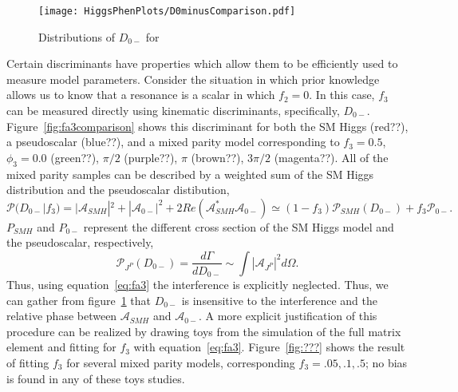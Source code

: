 \begin{figure}
\begin{center}
\texttt{[image: HiggsPhenPlots/D0minusComparison.pdf]}
\label{fig:fa3Comparison}
\caption{Distributions of $D_{0-}$ for }
\end{center}
\end{figure}

Certain discriminants have properties which allow them to be efficiently
used to measure model parameters.  Consider the situation in which prior
knowledge allows us to know that a resonance is a scalar in which $f_2=0$.
In this case, $f_3$ can be measured directly using kinematic discriminants,
specifically, $D_{0-}$.  Figure~\ref{fig:fa3comparison} shows this discriminant for
both the SM Higgs (red??), a pseudoscalar (blue??), and a mixed parity 
model corresponding to $f_3=0.5$, $\phi_3=0.0$ (green??), $\pi/2$ (purple??),
$\pi$ (brown??), $3\pi/2$ (magenta??).  All of the mixed parity samples
can be described by a weighted sum of the SM Higgs distribution and the 
pseudoscalar distibution, 
\begin{equation}
\mathscr{P}(D_{0-}|f_3) = |\mathscr{A}_{SMH}|^2 + |\mathscr{A}_{0-}|^2 + 2Re(\mathscr{A}_{SMH}^*\mathscr{A}_{0-}) \simeq (1-f_3)\mathscr{P}_{SMH}(D_{0-})+f_3\mathscr{P}_{0-}.
\label{eq:fa3}
\end{equation}
$P_{SMH}$ and $P_{0-}$ represent the different cross section of the 
SM Higgs model and the pseudoscalar, respectively, 
\begin{equation}
\mathscr{P}_{J^P}(D_{0-}) = \frac{d\Gamma}{dD_{0-}} \sim \int |\mathscr{A}_{J^P}|^2d\Omega.
\end{equation}
Thus, using equation~\ref{eq:fa3} the interference is explicitly neglected.  
Thus, we can gather from figure~\ref{fig:fa3Comparison} that $D_{0-}$ is insensitive to
the interference and the relative phase between $\mathscr{A}_{SMH}$ and
$\mathscr{A}_{0-}$.  A more explicit justification of this procedure can be
realized by drawing toys from the simulation of the full matrix element and
fitting for $f_3$ with equation~\ref{eq:fa3}.  Figure~\ref{fig:???} shows
the result of fitting $f_3$ for several mixed parity models, corresponding 
$f_3=.05,.1,.5$; no bias is found in any of these toys studies. 
